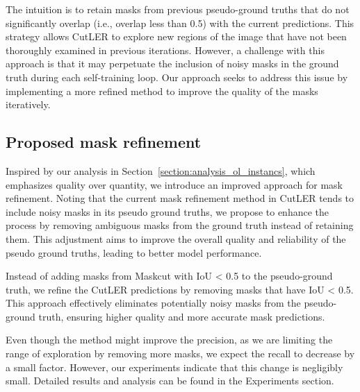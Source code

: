 The intuition is to retain masks from previous pseudo-ground truths that do not significantly overlap (i.e., overlap less than 0.5) with the current predictions. This strategy allows CutLER to explore new regions of the image that have not been thoroughly examined in previous iterations. However, a challenge with this approach is that it may perpetuate the inclusion of noisy masks in the ground truth during each self-training loop. Our approach seeks to address this issue by implementing a more refined method to improve the quality of the masks iteratively.

\subsection{Proposed mask refinement}
Inspired by our analysis in Section~\ref{section:analysis_ol_instancs}, which emphasizes quality over quantity, we introduce an improved approach for mask refinement. Noting that the current mask refinement method in CutLER tends to include noisy masks in its pseudo ground truths, we propose to enhance the process by removing ambiguous masks from the ground truth instead of retaining them. This adjustment aims to improve the overall quality and reliability of the pseudo ground truths, leading to better model performance.

Instead of adding masks from Maskcut with IoU < 0.5 to the pseudo-ground truth, we refine the CutLER predictions by removing masks that have IoU < 0.5. This approach effectively eliminates potentially noisy masks from the pseudo-ground truth, ensuring higher quality and more accurate mask predictions.

Even though the method might improve the precision, as we are limiting the range of exploration by removing more masks, we expect the recall to decrease by a small factor. However, our experiments indicate that this change is negligibly small. Detailed results and analysis can be found in the Experiments section.

